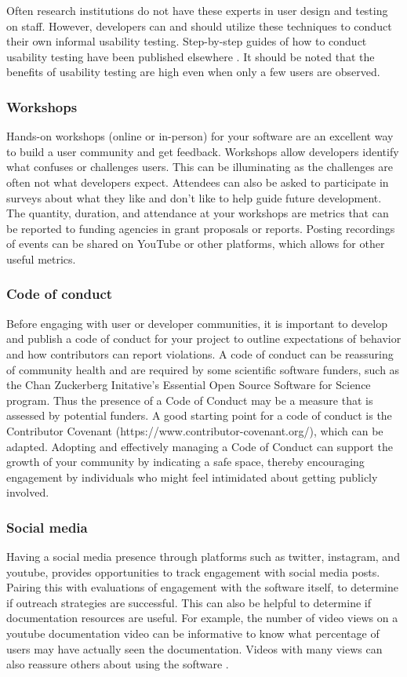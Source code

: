 \documentclass{article}
\begin{document}
Often research institutions do not have these experts in user design and testing on staff. However, developers can and should utilize these techniques to conduct their own informal usability testing. Step-by-step guides of how to conduct usability testing have been published elsewhere \cite{savonen_2021}.  It should be noted that the benefits of usability testing are high even when only a few users are observed. 

\subsubsection{Workshops}
Hands-on workshops (online\cite{dillon_experiences_2021} or in-person) for your software are an excellent way to build a user community and get feedback. Workshops allow developers identify what confuses or challenges users. This can be illuminating as the challenges are often not what developers expect. Attendees can also be asked to participate in surveys about what they like and don't like to help guide future development. The quantity, duration, and attendance at your workshops are metrics that can be reported to funding agencies in grant proposals or reports. Posting recordings of events can be shared on YouTube or other platforms, which allows for other useful metrics. 

\subsubsection{Code of conduct}
Before engaging with user or developer communities, it is important to develop and publish a code of conduct for your project to outline expectations of behavior and how contributors can report violations. A code of conduct can be reassuring of community health and are required by some scientific software funders, such as the Chan Zuckerberg Initative’s Essential Open Source Software for Science program. Thus the presence of a Code of Conduct may be a measure that is assessed by potential funders. A good starting point for a code of conduct is the Contributor Covenant (https://www.contributor-covenant.org/), which can be adapted. Adopting and effectively managing\cite{aurora_how_2019} a  Code of Conduct can support the growth of your community by indicating a safe space, thereby encouraging engagement by individuals who might feel intimidated about getting publicly involved.

\subsubsection{Social media}
Having a social media presence through platforms such as twitter, instagram, and youtube, provides opportunities to track engagement with social media posts.  Pairing this with evaluations of engagement with the software itself, to determine if outreach strategies are successful. This can also be helpful to determine if documentation resources are useful. For example, the number of video views on a youtube documentation video can be informative to know what percentage of users may have actually seen the documentation. Videos with many views can also reassure others about using the software . 
\end{document}

